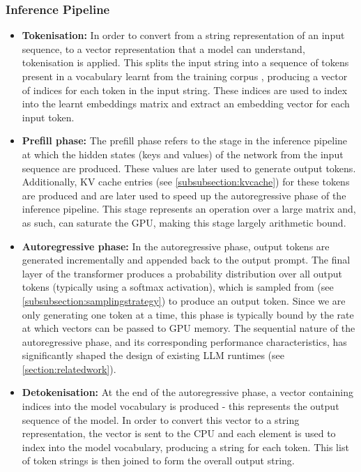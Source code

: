 \documentclass[12pt,twoside]{report}
\begin{document}
\subsubsection{Inference Pipeline}\label{subsubsection:inferencepipeline}
\begin{itemize}
  \item \textbf{Tokenisation:}
    In order to convert from a string representation of an input sequence, to a vector representation that a model can understand, tokenisation is applied.
    This splits the input string into a sequence of tokens present in a vocabulary learnt from the training corpus \cite{radford2019language} \cite{sennrich2015neural}, producing a vector of indices for each token in the input string.
    These indices are used to index into the learnt embeddings matrix and extract an embedding vector for each input token.
  \item \textbf{Prefill phase:}
    The prefill phase refers to the stage in the inference pipeline at which the hidden states (keys and values) of the network from the input sequence are produced.
    These values are later used to generate output tokens.
    Additionally, KV cache entries (see \ref{subsubsection:kvcache}) for these tokens are produced and are later used to speed up the autoregressive phase of the inference pipeline.
    This stage represents an operation over a large matrix and, as such, can saturate the GPU, making this stage largely arithmetic bound.
  \item \textbf{Autoregressive phase:}
    In the autoregressive phase, output tokens are generated incrementally and appended back to the output prompt. 
    The final layer of the transformer produces a probability distribution over all output tokens (typically using a softmax activation), which is sampled from (see \ref{subsubsection:samplingstrategy}) to produce an output token.
    Since we are only generating one token at a time, this phase is typically bound by the rate at which vectors can be passed to GPU memory.
    The sequential nature of the autoregressive phase, and its corresponding performance characteristics, has significantly shaped the design of existing LLM runtimes (see \ref{section:relatedwork}).
  \item \textbf{Detokenisation:}
    At the end of the autoregressive phase, a vector containing indices into the model vocabulary is produced - this represents the output sequence of the model.
    In order to convert this vector to a string representation, the vector is sent to the CPU and each element is used to index into the model vocabulary, producing a string for each token.
    This list of token strings is then joined to form the overall output string.
\end{itemize}
\end{document}
